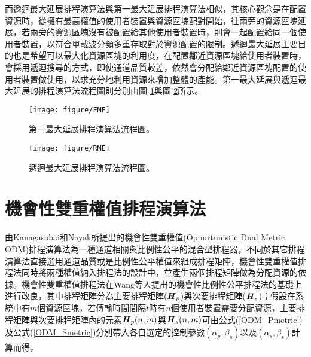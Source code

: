 而遞迴最大延展排程演算法與第一最大延展排程演算法相似，其核心觀念是在配置資源時，從擁有最高權值的使用者裝置與資源區塊配對開始，往兩旁的資源區塊延展，若兩旁的資源區塊沒有被配置給其他使用者裝置時，則會一起配置給同一個使用者裝置，以符合單載波分頻多重存取對於資源配置的限制。遞迴最大延展主要目的也是希望可以最大化資源區塊的利用度，在配置鄰近資源區塊給使用者裝置時，會採用遞迴搜尋的方式，即使通道品質較差，依然會分配給鄰近資源區塊配置的使用者裝置做使用，以求充分地利用資源來增加整體的產能。第一最大延展與遞迴最大延展的排程演算法流程圖則分別由圖 \ref{fig:FME}與圖 \ref{fig:RME}所示。
\begin{figure}[H]
\centering
\vskip 20pt
\texttt{[image: figure/FME]}
\caption 
{\label{fig:FME}第一最大延展排程演算法流程圖。}
\end{figure}

\begin{figure}[H]
\centering
\vskip 20pt
\texttt{[image: figure/RME]}
\caption 
{\label{fig:RME}遞迴最大延展排程演算法流程圖。}
\end{figure}
\clearpage
\section{機會性雙重權值排程演算法}
由Kanagasabai和Nayak所提出的機會性雙重權值(Oppurtunistic Dual Metric, ODM)排程演算法\cite{kana2015}為一種通道相關與比例性公平的混合型排程器，不同於其它排程演算法直接選用通道品質或是比例性公平權值來組成排程矩陣，機會性雙重權值排程法同時將兩種權值納入排程法的設計中，並產生兩個排程矩陣做為分配資源的依據。機會性雙重權值排程法在Wang等人提出的機會性比例性公平排程法\cite{wang2014}的基礎上進行改良，其中排程矩陣分為主要排程矩陣($\textbf{\textit{H}}_p$)與次要排程矩陣($\textbf{\textit{H}}_s$)；假設在系統中有$m$個資源區塊，若傳輸時間間隔$t$時有$n$個使用者裝置需要分配資源，主要排程矩陣與次要排程矩陣內的元素$\textbf{\textit{H}}_p(n,m)$與$\textbf{\textit{H}}_s(n,m)$可由公式(\ref{ODM_Pmetric})及公式(\ref{ODM_Smetric})分別帶入各自選定的控制參數$(\alpha_p,\beta_p)$以及$(\alpha_s,\beta_s)$計算而得，

